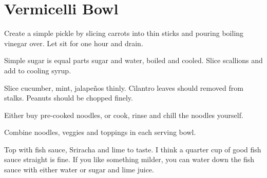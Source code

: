 
\section{Vermicelli Bowl}
\begin{recipe}


Create a simple pickle by slicing carrots into thin sticks and pouring boiling vinegar over. Let sit for one hour and drain.


Simple sugar is equal parts sugar and water, boiled and cooled. Slice scallions and add to cooling syrup.


Slice cucumber, mint, jalapeños thinly. Cilantro leaves should removed from stalks. Peanuts should be chopped finely.


Either buy pre-cooked noodles, or cook, rinse and chill the noodles yourself.

Combine noodles, veggies and toppings in each serving bowl.


Top with fish sauce, Sriracha and lime to taste. I think a quarter cup of good fish sauce straight is fine. If you like something milder, you can water down the fish sauce with either water or sugar and lime juice.


\end{recipe}
